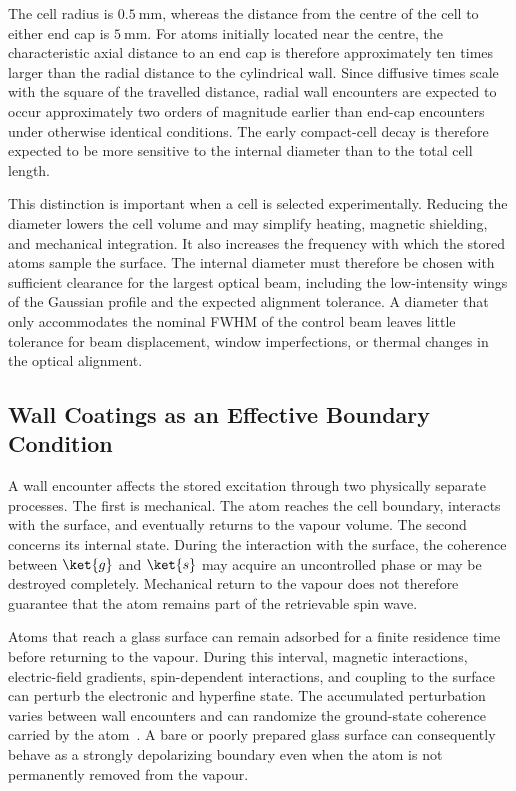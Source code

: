 The cell radius is $\SI{0.5}{\milli\metre}$, whereas the distance from the centre of the cell to either end cap is $\SI{5}{\milli\metre}$. For atoms initially located near the centre, the characteristic axial distance to an end cap is therefore approximately ten times larger than the radial distance to the cylindrical wall. Since diffusive times scale with the square of the travelled distance, radial wall encounters are expected to occur approximately two orders of magnitude earlier than end-cap encounters under otherwise identical conditions. The early compact-cell decay is therefore expected to be more sensitive to the internal diameter than to the total cell length.

This distinction is important when a cell is selected experimentally. Reducing the diameter lowers the cell volume and may simplify heating, magnetic shielding, and mechanical integration. It also increases the frequency with which the stored atoms sample the surface. The internal diameter must therefore be chosen with sufficient clearance for the largest optical beam, including the low-intensity wings of the Gaussian profile and the expected alignment tolerance. A diameter that only accommodates the nominal FWHM of the control beam leaves little tolerance for beam displacement, window imperfections, or thermal changes in the optical alignment.

\subsection{Wall Coatings as an Effective Boundary Condition}
\label{sec:results_wall_coatings}

A wall encounter affects the stored excitation through two physically separate processes. The first is mechanical. The atom reaches the cell boundary, interacts with the surface, and eventually returns to the vapour volume. The second concerns its internal state. During the interaction with the surface, the coherence between $\ket{g}$ and $\ket{s}$ may acquire an uncontrolled phase or may be destroyed completely. Mechanical return to the vapour does not therefore guarantee that the atom remains part of the retrievable spin wave.

Atoms that reach a glass surface can remain adsorbed for a finite residence time before returning to the vapour. During this interval, magnetic interactions, electric-field gradients, spin-dependent interactions, and coupling to the surface can perturb the electronic and hyperfine state. The accumulated perturbation varies between wall encounters and can randomize the ground-state coherence carried by the atom~\cite{OP_Happer_1972}. A bare or poorly prepared glass surface can consequently behave as a strongly depolarizing boundary even when the atom is not permanently removed from the vapour.

